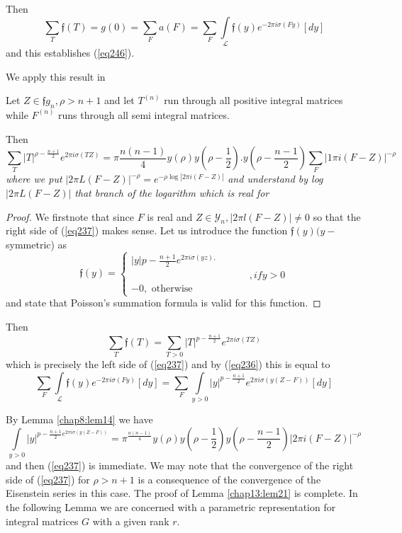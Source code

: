 Then
$$
\sum_T \mathfrak{f} (T) = g (0) = \sum_F a(F) = \sum_F
\int\limits_{\mathscr{L}} \mathfrak{f} (y) e^{-2 \pi i \sigma (F y)} [d
  y] 
$$
and this establishes (\ref{eq246}). 

We apply this result in

\begin{lem}\label{chap13:lem21}%
 Let $Z \in \mathfrak{f}g_n, \rho > n + 1$ and let $T^{(n)}$ run
  through all positive integral matrices while $F^{(n)}$ runs through
  all semi integral matrices.  
\end{lem}

Then 
{\fontsize{10pt}{12pt}\selectfont
\begin{equation*}
\sum_T |T|^{\rho - \frac{n + 1}{2}} e^{2 \pi i \sigma (TZ)} = \pi
\frac{n (n-1)}{4} y (\rho) y (\rho - \frac{1}{2}). y
(\rho - \frac{n-1}{2}) \sum_F | 1 \pi i (F- Z)|^{- \rho}
\tag{237}\label{eq237}   
\end{equation*}}\relax
\textit{where we put} $| 2 \pi L (F-Z)|^{- \rho} = e^{- \rho \log |2
  \pi i (F-Z)|}$ \textit{and understand by log } $|2 \pi L (F- Z)|$
\textit{that branch of the logarithm which is real for} 

\begin{proof}
We first\pageoriginale note that since $F$ is real and $Z \in
\mathscr{Y}_n, | 2\pi 
l (F - Z)| \neq 0$ so that the right side of (\ref{eq237}) makes sense. Let
us introduce the function $\mathfrak{f} (y) (y-$ symmetric)
as  
$$
\mathfrak{f}(y)=
\begin{cases}
| y| p - \frac{n + 1}{2} e^{2 \pi i \sigma (y z),}\\
\hspace{5cm} , if  y > 0\\
-0, \text{ otherwise }
\end{cases}
$$
and state that Poisson's summation formula is valid for this
function. 
\end{proof}

Then 
$$
\sum_T \mathfrak{f}(T) = \sum_{T > 0} |T|^{p - \frac{ n + 1 }{2}} e^{2
  \pi i \sigma (TZ)} 
$$
which is precisely the left side of (\ref{eq237}) and by (\ref{eq236})
this is equal to  
$$
\sum_F \int\limits_{\mathscr{L}} \mathfrak{f} (y) e^{- 2 \pi i \sigma (F
  y)}[d y ]= \sum_F \int\limits_{y > 0} |y|^{p - \frac{n
    + 1}{2}} e^{2 \pi i \sigma (y (Z - F))}[ d y] 
$$

By Lemma \ref{chap8:lem14} we have
$$
\int\limits_{y > 0} |y|^{{p - \frac{n + 1}{2}} e^{2 \pi i \sigma (y
    (Z - F))}} = \pi^{\frac{n (n - 1)}{4}} y(\rho) y (\rho -
\frac{1}{2}) y (\rho - \frac{n - 1}{2})| 2 \pi i (F -Z)|^{- \rho} 
$$
and then (\ref{eq237}) is immediate. We may note that the convergence of
the right side of (\ref{eq237}) for $\rho > n + 1$ is a consequence of the
convergence of the Eisenstein series in this case. The proof of Lemma
\ref{chap13:lem21} is complete. In the following Lemma we are concerned with a
parametric representation for integral matrices $G$ with a given rank
$r$. 

